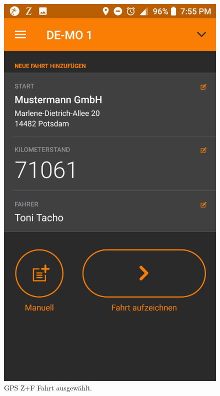\documentclass[a4paper]{article}
\begin{document}
\begin{figure}[H]
\begin{minipage}[b]{.4\linewidth}
        \includegraphics[scale=0.14]{img/pro2}
        \caption{\label{img:img/pro2}GPS Z+F Fahrt ausgewählt.}
    \end{minipage}
\end{figure}
\end{document}
